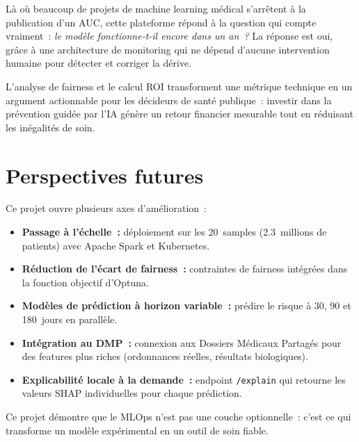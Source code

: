Là où beaucoup de projets de machine learning médical s'arrêtent à la publication
d'un AUC, cette plateforme répond à la question qui compte vraiment~:
\textit{le modèle fonctionne-t-il encore dans un an~?} La réponse est oui,
grâce à une architecture de monitoring qui ne dépend d'aucune intervention
humaine pour détecter et corriger la dérive.

L'analyse de fairness et le calcul ROI transforment une métrique technique
en un argument actionnable pour les décideurs de santé publique~: investir dans
la prévention guidée par l'IA génère un retour financier mesurable tout en
réduisant les inégalités de soin.

\section*{Perspectives futures}

Ce projet ouvre plusieurs axes d'amélioration~:

\begin{itemize}
  \item \textbf{Passage à l'échelle~:} déploiement sur les 20~samples
        (2.3~millions de patients) avec Apache Spark et Kubernetes.
  \item \textbf{Réduction de l'écart de fairness~:} contraintes de fairness
        intégrées dans la fonction objectif d'Optuna.
  \item \textbf{Modèles de prédiction à horizon variable~:} prédire le risque
        à 30, 90 et 180~jours en parallèle.
  \item \textbf{Intégration au DMP~:} connexion aux Dossiers Médicaux Partagés
        pour des features plus riches (ordonnances réelles, résultats biologiques).
  \item \textbf{Explicabilité locale à la demande~:} endpoint \texttt{/explain}
        qui retourne les valeurs SHAP individuelles pour chaque prédiction.
\end{itemize}

\vspace{1em}
\noindent Ce projet démontre que le MLOps n'est pas une couche optionnelle~:
c'est ce qui transforme un modèle expérimental en un outil de soin fiable.
